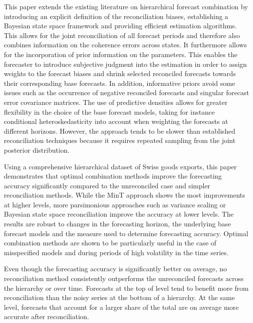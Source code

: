 \documentclass[a4paper,fleqn,11pt]{article}
\begin{document}
This paper extends the existing literature on hierarchical forecast combination by introducing an explicit definition of the reconciliation biases, establishing a Bayesian state space framework and providing efficient estimation algorithms. This allows for the joint reconciliation of all forecast periods and therefore also combines information on the coherence errors across states.  It furthermore allows for the incorporation of prior information on the parameters. This enables the forecaster to introduce subjective judgment into the estimation in order to assign weights to the forecast biases and shrink selected reconciled forecasts towards their corresponding base forecasts. In addition, informative priors avoid some issues such as the occurrence of negative reconciled forecasts and singular forecast error covariance matrices. The use of predictive densities allows for greater flexibility in the choice of the base forecast models, taking for instance conditional heteroskedasticity into account when weighting the forecasts at different horizons. However, the approach tends to be slower than established reconciliation techniques because it requires repeated sampling from the joint posterior distribution.

Using a comprehensive hierarchical dataset of Swiss goods exports, this paper demonstrates that optimal combination methods improve the forecasting accuracy significantly compared to the unreconciled case and simpler reconciliation methods. While the MinT approach shows the most improvements at higher levels, more parsimonious approaches such as variance scaling or Bayesian state space reconciliation improve the accuracy at lower levels. The results are robust to changes in the forecasting horizon, the underlying base forecast models and the measure used to determine forecasting accuracy. Optimal combination methods are shown to be particularly useful in the case of misspecified models and during periods of high volatility in the time series.

Even though the forecasting accuracy is significantly better on average, no reconciliation method consistently outperforms the unreconciled forecasts across the hierarchy or over time. Forecasts at the top of level tend to benefit more from reconciliation than the noisy series at the bottom of a hierarchy. At the same level, forecasts that account for a larger share of the total are on average more accurate after reconciliation.


\clearpage


\clearpage


\end{document}
